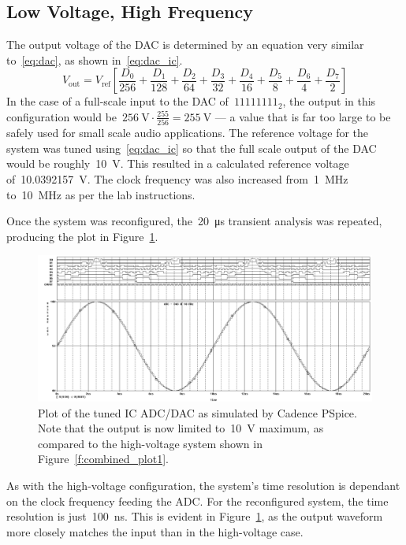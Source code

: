 \subsection{Low Voltage, High Frequency}
The output voltage of the DAC is determined by an equation very similar
to~\eqref{eq:dac}, as shown in~\eqref{eq:dac_ic}.
%
\begin{equation}
	V_\text{out} = V_\text{ref} \left[
		\frac{D_0}{256} +
		\frac{D_1}{128} +
		\frac{D_2}{64}  +
		\frac{D_3}{32}  +
		\frac{D_4}{16}  +
		\frac{D_5}{8}   +
		\frac{D_6}{4}   +
		\frac{D_7}{2} \right]
	\label{eq:dac_ic}
\end{equation}
%
In the case of a full-scale input to the DAC of~$11111111_2$, the output in
this configuration would be~$\SI{256}{\volt} \cdot \frac{255}{256} =
\SI{255}{\volt}$ --- a value that is far too large to be safely used for small
scale audio applications.  The reference voltage for the system was tuned
using~\eqref{eq:dac_ic} so that the full scale output of the DAC would be
roughly~\SI{10}{\volt}.  This resulted in a calculated reference voltage
of~\SI{10.0392157}{\volt}.  The clock frequency was also increased
from~\SI{1}{\mega\hertz} to~\SI{10}{\mega\hertz} as per the lab instructions.

Once the system was reconfigured, the~\SI{20}{\micro\second} transient analysis
was repeated, producing the plot in Figure~\ref{f:combined_plot2}.
%
\begin{figure}[H]
\centering
	\includegraphics[width=.8\textwidth]{img/plot/part3_plot2.PNG}
	\parbox{.8\textwidth}{
	\caption[Integrated Circuit --- Tuned Results]{Plot of the tuned IC ADC/DAC
	as simulated by Cadence PSpice.  Note that the output is now limited
	to~\SI{10}{\volt} maximum, as compared to the high-voltage system shown in
	Figure~\ref{f:combined_plot1}.}
	\label{f:combined_plot2}}
\end{figure}
%
As with the high-voltage configuration, the system's time resolution is
dependant on the clock frequency feeding the ADC.  For the reconfigured system,
the time resolution is just~\SI{100}{\nano\second}.  This is evident in
Figure~\ref{f:combined_plot2}, as the output waveform more closely matches the
input than in the high-voltage case.
